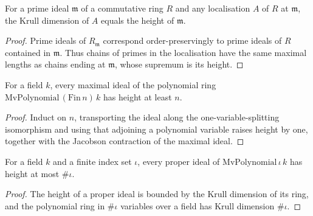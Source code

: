 \begin{lemma}\label{mk-lem:ringKrullDim_localization_eq_height_atPrime}
  \leanok

  For a prime ideal \(\mathfrak m\) of a commutative ring \(R\) and any localisation
  \(A\) of \(R\) at \(\mathfrak m\), the Krull dimension of \(A\) equals the height of
  \(\mathfrak m\).
\end{lemma}

\begin{proof}
  Prime ideals of \(R_{\mathfrak m}\) correspond order-preservingly to
  prime ideals of \(R\) contained in \(\mathfrak m\).  Thus chains of
  primes in the localisation have the same maximal lengths as chains
  ending at \(\mathfrak m\), whose supremum is its height.
\end{proof}

\begin{lemma}
  \label{mk-lem:mvPolynomial_maximalIdeal_height_ge_card}
  For a field \(k\), every maximal ideal of the polynomial ring
  \(\mathrm{MvPolynomial}\,(\mathrm{Fin}\,n)\,k\) has height at least \(n\).
\end{lemma}

\begin{proof}
  Induct on \(n\), transporting the ideal along the
  one-variable-splitting isomorphism and using that adjoining a polynomial variable
  raises height by one, together with the Jacobson contraction of the maximal ideal.
\end{proof}

\begin{lemma}
  \label{mk-lem:mvPolynomial_maximalIdeal_height_le_natCard}

  For a field \(k\) and a finite index set \(\iota\), every proper ideal of
  \(\mathrm{MvPolynomial}\,\iota\,k\) has height at most \(\#\iota\).
\end{lemma}

\begin{proof}
  The height of a proper ideal is bounded by the Krull dimension of its
  ring, and the polynomial ring in \(\#\iota\) variables over a field has
  Krull dimension \(\#\iota\).
\end{proof}

